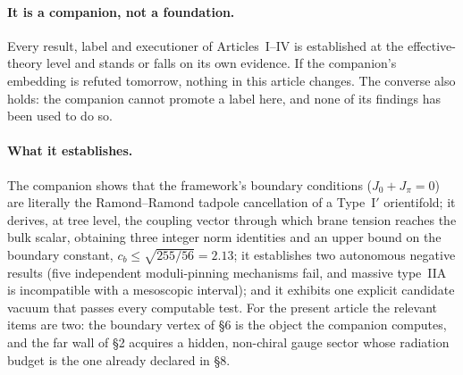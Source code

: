 \paragraph{It is a companion, not a foundation.} Every result, label and executioner of Articles~I--IV is established at the effective-theory level and stands or falls on its own evidence. If the companion's embedding is refuted tomorrow, nothing in this article changes. The converse also holds: the companion cannot promote a label here, and none of its findings has been used to do so.

\paragraph{What it establishes.} The companion shows that the framework's boundary conditions ($J_{0}+J_{\pi}=0$) are literally the Ramond--Ramond tadpole cancellation of a Type~I$'$ orientifold; it derives, at tree level, the coupling vector through which brane tension reaches the bulk scalar, obtaining three integer norm identities and an upper bound on the boundary constant, $c_{b}\leq\sqrt{255/56}=2.13$; it establishes two autonomous negative results (five independent moduli-pinning mechanisms fail, and massive type~IIA is incompatible with a mesoscopic interval); and it exhibits one explicit candidate vacuum that passes every computable test. For the present article the relevant items are two: the boundary vertex of \S6 is the object the companion computes, and the far wall of \S2 acquires a hidden, non-chiral gauge sector whose radiation budget is the one already declared in \S8.

